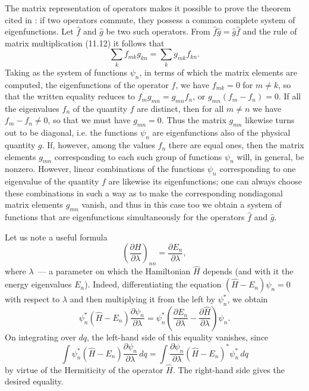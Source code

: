 The matrix representation of operators makes it possible to prove the
theorem cited in : if two operators commute, they possess
a common complete system of eigenfunctions. Let $\hat f$ and $\hat g$ be two
such operators. From $\hat f\hat g=\hat g\hat f$ and the rule of matrix
multiplication (11.12) it follows that
\[
  \sum_k f_{mk}g_{kn}=\sum_k g_{mk}f_{kn}.
\]
Taking as the system of functions $\psi_n$, in terms of which the matrix
elements are computed, the eigenfunctions of the operator $\hat f$, we have
$f_{mk}=0$ for $m\ne k$, so that the written equality reduces to
$f_mg_{mn}=g_{mn}f_n$, or $g_{mn}(f_m-f_n)=0$. If all the eigenvalues
$f_n$ of the quantity $f$ are distinct, then for all $m\ne n$ we have
$f_m-f_n\ne0$, so that we must have $g_{mn}=0$.
Thus the matrix $g_{mn}$ likewise turns out to be diagonal, i.e. the functions
$\psi_n$ are eigenfunctions also of the physical quantity $g$. If, however,
among the values $f_n$ there are equal ones, then the matrix elements $g_{mn}$
corresponding to each such group of functions $\psi_n$ will, in general, be
nonzero. However, linear combinations of the functions $\psi_n$ corresponding
to one eigenvalue of the quantity $f$ are likewise its eigenfunctions; one can
always choose these combinations in such a way as to make the corresponding
nondiagonal matrix elements $g_{mn}$ vanish, and thus in this case too we
obtain a system of functions that are eigenfunctions simultaneously for the
operators $\hat f$ and $\hat g$.

Let us note a useful formula
\begin{equation}
  \left(\frac{\partial H}{\partial\lambda}\right)_{nn}
  =\frac{\partial E_n}{\partial\lambda},
  \tag{11.16}
\end{equation}
where $\lambda$~--- a parameter on which the Hamiltonian $\hat H$ depends
(and with it the energy eigenvalues $E_n$). Indeed, differentiating the
equation $(\hat H-E_n)\psi_n=0$ with respect to $\lambda$ and then multiplying
it from the left by $\psi_n^*$, we obtain
\[
  \psi_n^*(\hat H-E_n)\frac{\partial\psi_n}{\partial\lambda}
  =\psi_n^*\left(\frac{\partial E_n}{\partial\lambda}
  -\frac{\partial\hat H}{\partial\lambda}\right)\psi_n.
\]
On integrating over $dq$, the left-hand side of this equality vanishes, since
\[
 \int\psi_n^*(\hat H-E_n)\frac{\partial\psi_n}{\partial\lambda}\,dq
 =\int\frac{\partial\psi_n}{\partial\lambda}(\hat H-E_n)^*\psi_n^*\,dq
\]
by virtue of the Hermiticity of the operator $\hat H$. The right-hand side
gives the desired equality.

